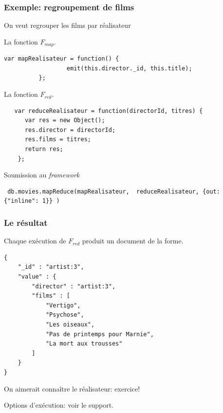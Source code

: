 \begin{frame}[fragile]
\frametitle{Exemple: regroupement de films}

On veut regrouper les films par réalisateur

\vfill


La fonction $F_{map}$.

\begin{verbatim}
var mapRealisateur = function() {
                  emit(this.director._id, this.title);
          };
\end{verbatim}

\vfill

La fonction $F_{red}$.

\begin{verbatim}
   var reduceRealisateur = function(directorId, titres) {
      var res = new Object();
      res.director = directorId;
      res.films = titres;
      return res;
    };
\end{verbatim}

\vfill

Soumission au \textit{framework}

\begin{verbatim}
 db.movies.mapReduce(mapRealisateur,  reduceRealisateur, {out: {"inline": 1}} )
\end{verbatim}
\end{frame}

\begin{frame}[fragile]
\frametitle{Le résultat}

Chaque exécution de $F_{red}$ produit un document de la forme.
\begin{verbatim}
{
	"_id" : "artist:3",
	"value" : {
		"director" : "artist:3",
		"films" : [
			"Vertigo",
			"Psychose",
			"Les oiseaux",
			"Pas de printemps pour Marnie",
			"La mort aux trousses"
		]
	}
}
\end{verbatim}

\vfill

On aimerait connaître le réalisateur: exercice!

\vfill

Options d'exécution: voir le support.


\end{frame}


